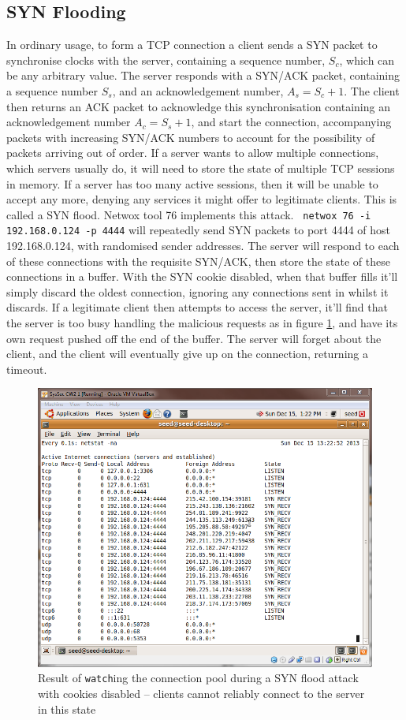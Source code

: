\subsection{SYN Flooding}\label{sec_synflood}

In ordinary usage, to form a TCP connection a client sends a SYN packet to synchronise clocks with the server,
containing a sequence number, $S_c$, which can be any arbitrary value. The server responds with a SYN/ACK packet,
containing a sequence number $S_s$, and an acknowledgement number, $A_s = S_c+1$. The client then returns an ACK packet
to acknowledge this synchronisation containing an acknowledgement number $A_c = S_s+1$, and start the connection,
accompanying packets with increasing SYN/ACK numbers to account for the possibility of packets arriving out of order. If a
server wants to allow multiple connections, which servers usually do, it will need to store the state of multiple TCP
sessions in memory. If a server has too many active sessions, then it will be unable to accept any more, denying any
services it might offer to legitimate clients. This is called a SYN flood. Netwox tool 76 implements this attack. {\tt
netwox 76 -i 192.168.0.124 -p 4444} will repeatedly send SYN packets to port 4444 of host 192.168.0.124, with randomised
sender addresses. The server will respond to each of these connections with the requisite SYN/ACK, then store the state
of these connections in a buffer. With the SYN cookie disabled, when that buffer fills it'll simply discard the oldest
connection, ignoring any connections sent in whilst it discards. If a legitimate client then attempts to access the
server, it'll find that the server is too busy handling the malicious requests as in figure \ref{fig:flood_no_cookie},
and have its own request pushed off the end of the buffer. The server will forget about the client, and the client will
eventually give up on the connection, returning a timeout.

\begin{figure}[h]
    \centering \includegraphics[width=.7\linewidth]{images/syn_flood_during.png}
    \caption{Result of {\tt watch}ing the connection pool during a SYN flood attack with cookies disabled -- clients
    cannot reliably connect to the server in this state}
    \label{fig:flood_no_cookie}
\end{figure}

